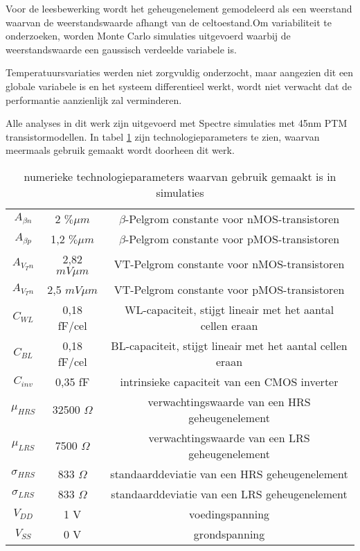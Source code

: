 Voor de leesbewerking wordt het geheugenelement gemodeleerd als een weerstand waarvan de weerstandswaarde afhangt van de celtoestand.Om variabiliteit te onderzoeken, worden Monte Carlo simulaties uitgevoerd waarbij de weerstandswaarde een gaussisch verdeelde variabele is.

Temperatuursvariaties werden niet zorgvuldig onderzocht, maar aangezien dit een globale variabele is en het systeem differentieel werkt, wordt niet verwacht dat de performantie aanzienlijk zal verminderen.

Alle analyses in dit werk zijn uitgevoerd met Spectre simulaties met 45nm PTM transistormodellen. In tabel \ref{tab:properties} zijn technologieparameters te zien, waarvan meermaals gebruik gemaakt wordt doorheen dit werk.

\begin{table}
	\begin{tabular}{ccc}
	\hline
    $A_{\beta n}$ & 2 $\% \mu m$ & $\beta$-Pelgrom constante voor nMOS-transistoren \\
    $A_{\beta p}$ & 1,2 $\% \mu m$ & $\beta$-Pelgrom constante voor pMOS-transistoren \\
    $A_{V_{T} n}$ & 2,82 $mV \mu m$ & VT-Pelgrom constante voor nMOS-transistoren \\
    $A_{V_{T} n}$ & 2,5 $mV \mu m$ & VT-Pelgrom constante voor pMOS-transistoren \\
    $C_{WL}$ & 0,18 fF/cel & WL-capaciteit, stijgt lineair met het aantal cellen eraan \\
    $C_{BL}$ & 0,18 fF/cel & BL-capaciteit, stijgt lineair met het aantal cellen eraan \\
    $C_{inv}$ & 0,35 fF & intrinsieke capaciteit van een CMOS inverter \\
    $\mu_{HRS}$ & 32500 $\Omega$ & verwachtingswaarde van een HRS geheugenelement \\
    $\mu_{LRS}$ & 7500 $\Omega$ & verwachtingswaarde van een LRS geheugenelement \\
    $\sigma_{HRS}$ & 833 $\Omega$ & standaarddeviatie van een HRS geheugenelement \\
    $\sigma_{LRS}$ & 833 $\Omega$ & standaarddeviatie van een LRS geheugenelement \\
    $V_{DD}$ & 1 V & voedingspanning \\
    $V_{SS}$ & 0 V & grondspanning \\
    \hline
  \end{tabular}
  \caption{numerieke technologieparameters waarvan gebruik gemaakt is in simulaties}
  \label{tab:properties}
\end{table}


